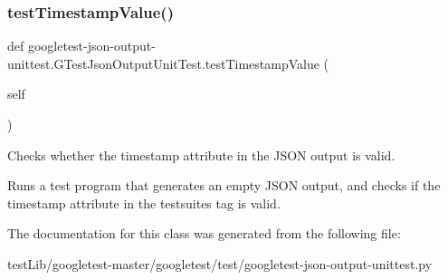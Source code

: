 \subsubsection{\texorpdfstring{test\+Timestamp\+Value()}{testTimestampValue()}}
{\footnotesize\ttfamily def googletest-\/json-\/output-\/unittest.\+G\+Test\+Json\+Output\+Unit\+Test.\+test\+Timestamp\+Value (\begin{DoxyParamCaption}\item[{}]{self }\end{DoxyParamCaption})}

\begin{DoxyVerb}Checks whether the timestamp attribute in the JSON output is valid.

Runs a test program that generates an empty JSON output, and checks if
the timestamp attribute in the testsuites tag is valid.
\end{DoxyVerb}
 

The documentation for this class was generated from the following file\+:\begin{DoxyCompactItemize}
\item 
test\+Lib/googletest-\/master/googletest/test/googletest-\/json-\/output-\/unittest.\+py\end{DoxyCompactItemize}
